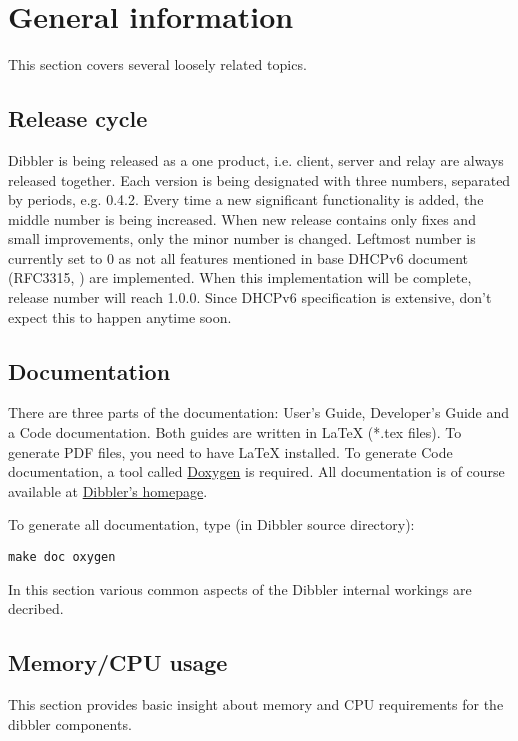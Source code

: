 
\section{General information}
This section covers several loosely related topics.

\subsection{Release cycle}
Dibbler is being released as a one product, i.e. client, server and
relay are always released together. Each version is being designated
with three numbers, separated by periods, e.g. 0.4.2. Every time a new
significant functionality is added, the middle number is being
increased. When new release contains only fixes and small
improvements, only the minor number is changed. Leftmost number is
currently set to 0 as not all features mentioned in base DHCPv6
document (RFC3315, \cite{rfc3315}) are implemented. When this
implementation will be complete, release number will reach
1.0.0. Since DHCPv6 specification is extensive, don't expect this to
happen anytime soon.

\subsection{Documentation}
\label{doc}
There are three parts of the documentation: User's Guide, Developer's
Guide and a Code documentation. Both guides are written in \LaTeX
(*.tex files). To generate PDF files, you need to have \LaTeX
installed. To generate Code documentation, 
a tool called \href{http://www.doxygen.org}{Doxygen} is required. All
documentation is of course available at
\href{http://klub.com.pl/dhcpv6}{Dibbler's homepage}.

To generate all documentation, type (in Dibbler source directory):
\begin{verbatim}
make doc oxygen
\end{verbatim}

In this section various common aspects of the Dibbler internal
workings are decribed.

\subsection{Memory/CPU usage}
This section provides basic insight about memory and CPU requirements
for the dibbler components. 

